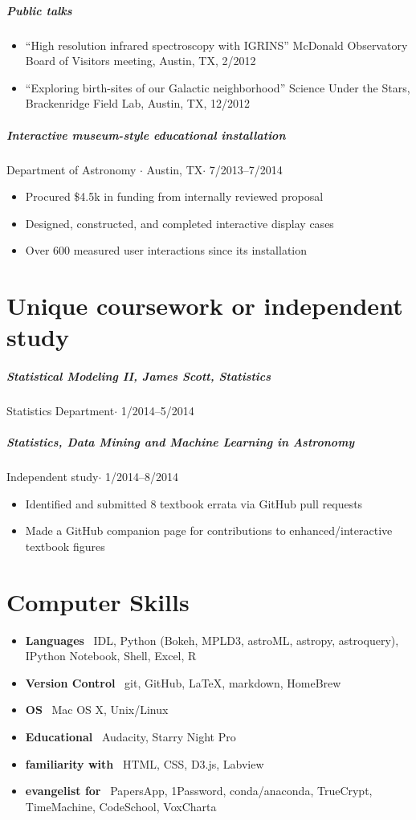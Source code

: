 \documentclass[10pt,letterpaper]{article}
\begin{document}
\subparagraph{Public talks}
	\begin{itemize}
	    \item ``High resolution infrared spectroscopy with IGRINS'' McDonald Observatory Board of Visitors meeting, Austin, TX, 2/2012
	    \item ``Exploring birth-sites of our Galactic neighborhood'' Science Under the Stars, Brackenridge Field Lab, Austin, TX, 12/2012
	\end{itemize}

\subparagraph{Interactive museum-style educational installation}
Department of Astronomy $\cdot$ Austin, TX$\cdot$ 7/2013--7/2014
	\begin{itemize}
	    \item Procured \$4.5k in funding from internally reviewed proposal
	    \item Designed, constructed, and completed interactive display cases
	    \item Over 600 measured user interactions since its installation
	\end{itemize}

\section*{Unique coursework or independent study}

\subparagraph{Statistical Modeling II, James Scott, Statistics}
Statistics Department$\cdot$ 1/2014--5/2014

\subparagraph{Statistics, Data Mining and Machine Learning in Astronomy}
Independent study$\cdot$ 1/2014--8/2014
	\begin{itemize}
	    \item Identified and submitted 8 textbook errata via GitHub pull requests
	    \item Made a GitHub companion page for contributions to enhanced/interactive textbook figures
	\end{itemize}
	
\section*{Computer Skills}

\begin{itemize}
    \item \textbf{Languages} \ IDL, Python (Bokeh, MPLD3, astroML, astropy, astroquery), IPython Notebook, Shell, Excel, R
    \item \textbf{Version Control} \ git, GitHub, \LaTeX, markdown, HomeBrew
    \item \textbf{OS} \ Mac OS X, Unix/Linux
    \item \textbf{Educational} \ Audacity, Starry Night Pro
    \item \textbf{familiarity with} \ HTML, CSS, D3.js, Labview
    \item \textbf{evangelist for} \ PapersApp, 1Password, conda/anaconda, TrueCrypt, TimeMachine, CodeSchool, VoxCharta
\end{itemize}
\end{document}
